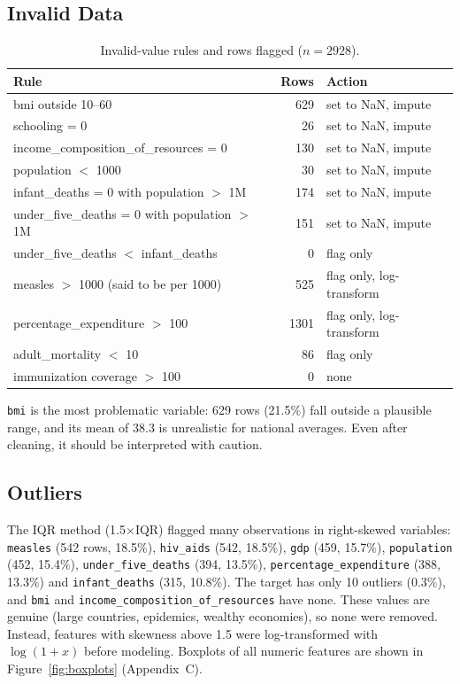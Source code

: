\documentclass[12pt,a4paper]{article}
\begin{document}
\subsection{Invalid Data}\label{sec:invalid}
\begin{table}[H]\centering\caption{Invalid-value rules and rows flagged ($n = 2928$).}
\begin{tabularx}{\textwidth}{Xrl}\toprule
\textbf{Rule} & \textbf{Rows} & \textbf{Action}\\\midrule
bmi outside 10--60 & 629 & set to NaN, impute\\
schooling = 0 & 26 & set to NaN, impute\\
income\_composition\_of\_resources = 0 & 130 & set to NaN, impute\\
population $<$ 1000 & 30 & set to NaN, impute\\
infant\_deaths = 0 with population $>$ 1M & 174 & set to NaN, impute\\
under\_five\_deaths = 0 with population $>$ 1M & 151 & set to NaN, impute\\
under\_five\_deaths $<$ infant\_deaths & 0 & flag only\\
measles $>$ 1000 (said to be per 1000) & 525 & flag only, log-transform\\
percentage\_expenditure $>$ 100 & 1301 & flag only, log-transform\\
adult\_mortality $<$ 10 & 86 & flag only\\
immunization coverage $>$ 100 & 0 & none\\\bottomrule
\end{tabularx}\end{table}

\texttt{bmi} is the most problematic variable: 629 rows (21.5\%) fall outside a plausible
range, and its mean of 38.3 is unrealistic for national averages. Even after cleaning,
it should be interpreted with caution.

\subsection{Outliers}
The IQR method (1.5$\times$IQR) flagged many observations in right-skewed variables:
\texttt{measles} (542 rows, 18.5\%), \texttt{hiv\_aids} (542, 18.5\%),
\texttt{gdp} (459, 15.7\%), \texttt{population} (452, 15.4\%),
\texttt{under\_five\_deaths} (394, 13.5\%), \texttt{percentage\_expenditure}
(388, 13.3\%) and \texttt{infant\_deaths} (315, 10.8\%). The target has only 10 outliers (0.3\%),
and \texttt{bmi} and \texttt{income\_composition\_of\_resources} have none.
These values are genuine (large countries, epidemics, wealthy economies), so none were removed.
Instead, features with skewness above 1.5 were log-transformed with $\log(1+x)$ before modeling.
Boxplots of all numeric features are shown in Figure~\ref{fig:boxplots} (Appendix~C).
\end{document}
